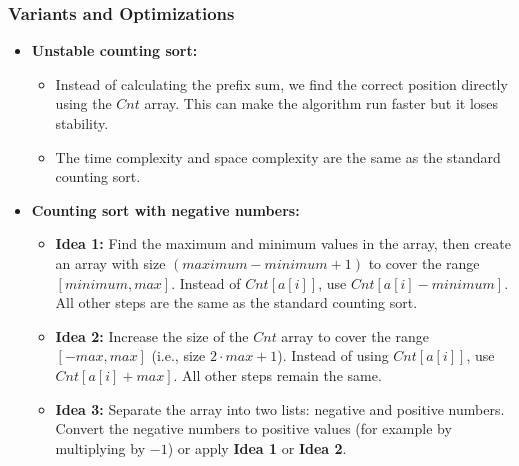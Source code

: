     \subsubsection{Variants and Optimizations}
        \begin{itemize}
        \item \textbf{Unstable counting sort\cite{bajpai2014ecounting}:}
            \begin{itemize}
                \item Instead of calculating the prefix sum, we find the correct position directly using the $Cnt$ array. This can make the algorithm run faster but it loses stability.
                \item The time complexity and space complexity are the same as the standard counting sort.
            \end{itemize}
        \end{itemize}
        \begin{itemize}
        \item \textbf{Counting sort with negative numbers\cite{stackoverflow_countingsort_negative}:}
            \begin{itemize}
                \item \textbf{Idea 1:} Find the maximum and minimum values in the array, then create an array with size $(maximum - minimum + 1)$ to cover the range $[minimum, max]$. Instead of $Cnt[a[i]]$, use $Cnt[a[i] - minimum]$. All other steps are the same as the standard counting sort.
                \item \textbf{Idea 2:} Increase the size of the $Cnt$ array to cover the range $[-max, max]$ (i.e., size $2 \cdot max + 1$). Instead of using $Cnt[a[i]]$, use $Cnt[a[i] + max]$. All other steps remain the same.
                \item \textbf{Idea 3\cite{saiana2018parallelcounting}:} Separate the array into two lists: negative and positive numbers. Convert the negative numbers to positive values (for example by multiplying by $-1$) or apply \textbf{Idea 1} or \textbf{Idea 2}.
            \end{itemize}
        \end{itemize}


